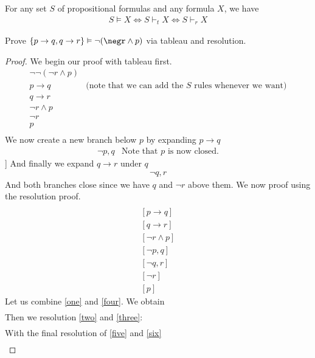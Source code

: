 \documentclass[a4paper]{article}
\theoremstyle{plain}
\newtheorem{thm}{Theorem}[section]
\theoremstyle{definition}
\newtheorem{exmp}{Example}[section]
\theoremstyle{remark}
\begin{document}
\begin{tcolorbox}[colback=black!3!white,colframe=black!60!white,title=\begin{thm}Strong soundness and completeness \label{Strong soundness and completeness}\end{thm}]
	For any set $S$ of propositional formulas and any formula $X$, we have
	\begin{align}
		S \vDash X \iff S \vdash_t X \iff S \vdash_r X
	\end{align}
\end{tcolorbox}
\begin{tcolorbox}[colback=black!3!white,colframe=black!60!white,title=\begin{exmp}S introduction Example \label{S introduction Example}\end{exmp}]
        Prove $\{ p\to q, q\to r\} \vDash \neg (\negr \land p)$ via tableau and resolution.
	\begin{proof}
		We begin our proof with tableau first.
		\begin{align}
			\neg \neg (\neg r \land p) &\\
			p \to q & \text{(note that we can add the $S$ rules whenever we want)} \\
			q \to r &\\
			\neg r \land p & \\
			\neg r & \\
			 p & \\
		\end{align}
		We now create a new branch below $p$ by expanding $p\to q$ 
		\begin{align}
			\neg p, q & \text{Note that $p$ is now closed.}
		\end{align}]
		And finally we expand $q \to r$ under $q$ 
		\begin{align}
			\neg q, r
		\end{align}
		And both branches close since we have $q$ and $\neg r$ above them. We now proof using the resolution proof.
		\begin{align}
			[ \neg \neg (\neg r \land p)] \\
			[p \to q] \\
			[q \to r] \\
			[\neg r \land p] \\
			[\neg p , q] \label{one} \\
			[\neg q, r] \label{two} \\
			[\neg r ] \label{three} \\
			[p] \label{four}
		\end{align}
		Let us combine \ref{one} and \ref{four}. We obtain
		\begin{align}
			[q] \label{five}
		\end{align}
		Then we resolution \ref{two} and \ref{three}:
		\begin{align}
			[\neg q] \label{six}
		\end{align}
		With the final resolution of \ref{five} and \ref{six}
		\begin{align}
			[]
		\end{align}
	\end{proof}
\end{tcolorbox}
\end{document}
